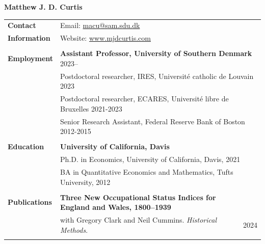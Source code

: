 \documentclass[a4paper,11pt,oneside]{article}
\begin{document}

\noindent  \LARGE{\textbf{Matthew J. D. Curtis}}  \\

\normalsize




\noindent \begin{longtable}{@{} p{0.175\linewidth} p{0.775\linewidth} p{0.05\linewidth}}
   
   
   
   \textbf{\large{Contact}}    &  \multicolumn{2}{l}{Email: \href{mailto:macu@sam.sdu.dk}{macu@sam.sdu.dk} }\\
   \textbf{\large{Information}}  &  \multicolumn{2}{l}{Website: \href{https://www.mjdcurtis.com/}{www.mjdcurtis.com} }\\
   \\ 
   
   \textbf{\large{Employment}}    &  \multicolumn{2}{l}{  \textbf{Assistant Professor, University of Southern Denmark} \hfill  2023--}\\
   &  \multicolumn{2}{l}{ Postdoctoral researcher, IRES, Universit\'{e} catholic de Louvain \hfill  2023}\\
   &  \multicolumn{2}{l}{ Postdoctoral researcher, ECARES, Universit\'{e} libre de Bruxelles \hfill  2021-2023}\\
   &  \multicolumn{2}{l}{ Senior Research Assistant, Federal Reserve Bank of Boston \hfill  2012-2015}\\
   \\
   \textbf{\large{Education}}    & \multicolumn{2}{l}{\textbf{University of California, Davis}} \\
   &  \multicolumn{2}{l}{Ph.D. in Economics, University of California, Davis, 2021}\\
   &  \multicolumn{2}{l}{BA in Quantitative Economics and Mathematics, Tufts University, 2012}\\
   \\
   
   \textbf{\large{Publications}}   
   
   & \textbf{Three New Occupational Status Indices for England and Wales, 1800--1939}\\ 
   &  with Gregory Clark and Neil Cummins. \emph{Historical Methods}. & \hfill 2024  \\
   \\
   

\end{longtable}
\end{document}
